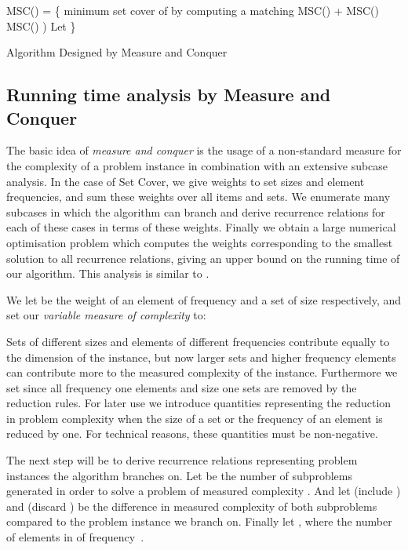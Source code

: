 \documentclass[fleqn]{stacs_proc}
\begin{document}
\begin{algorithm}
\begin{algorithmic}
\STATE MSC() = \{
\IF{}
	\RETURN minimum set cover of  by computing a matching
\ELSIF{}
	\RETURN MSC() + MSC()
\ELSIF{}
	\RETURN MSC()
\ELSIF{}
	\STATE 
	\RETURN 
\ELSIF{}
	\RETURN )
\ELSIF{}
	\RETURN 
\ELSE
	\STATE Let 
	\STATE 
	\RETURN 
\ENDIF
\STATE \}
\end{algorithmic}
\caption{Algorithm Designed by Measure and Conquer}
\label{algorithm}
\end{algorithm}



\subsection{Running time analysis by Measure and Conquer} \label{sec:m&c}
The basic idea of {\em measure and conquer} is the usage of a non-standard measure 
for the complexity of a problem instance in combination with an extensive subcase analysis.
In the case of {\sc Set Cover}, we give weights to set sizes and element frequencies,
and sum these weights over all items and sets. We enumerate many subcases in which the algorithm
can branch and derive recurrence relations for each of these cases in terms of these weights.
Finally we obtain a large numerical optimisation problem which computes the weights corresponding
to the smallest solution to all recurrence relations, giving an upper bound on the running time of our algorithm.
This analysis is similar to \cite{FominGK05a}.

We let  be the weight of an element of frequency  and a set of size  respectively,
and set our {\em variable measure of complexity}  to:

Sets of different sizes and elements of different frequencies contribute equally to the
dimension of the instance, but now larger sets and higher frequency elements can contribute
more to the measured complexity of the instance.
Furthermore we set  since all frequency one elements
and size one sets are removed by the reduction rules.
For later use we introduce quantities representing the reduction in problem complexity
when the size of a set or the frequency of an element is reduced by one.
For technical reasons, these quantities must be non-negative.


The next step will be to derive recurrence relations representing problem instances the algorithm branches on.
Let  be the number of subproblems generated in order to solve a problem of measured complexity .
And let  (include ) and  (discard ) be the difference in measured complexity
of both subproblems compared to the problem instance we branch on.
Finally let , where  the number of elements in  of frequency~.
\end{document}
